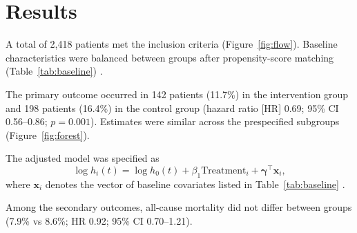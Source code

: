 \section{Results}
\label{sec:results}

A total of 2,418 patients met the inclusion criteria (Figure~\ref{fig:flow}). Baseline characteristics were balanced between groups after propensity-score matching (Table~\ref{tab:baseline}) \cite{austin2011introduction}.

The primary outcome occurred in 142 patients (11.7\%) in the intervention group and 198 patients (16.4\%) in the control group (hazard ratio [HR] 0.69; 95\% CI 0.56--0.86; $p = 0.001$). Estimates were similar across the prespecified subgroups (Figure~\ref{fig:forest}).

The adjusted model was specified as
\begin{equation}
  \log h_i(t) = \log h_0(t) + \beta_1 \text{Treatment}_i + \boldsymbol{\gamma}^\top \mathbf{x}_i ,
  \label{eq:cox}
\end{equation}
where $\mathbf{x}_i$ denotes the vector of baseline covariates listed in Table~\ref{tab:baseline} \cite{cox1972regression, therneau2000modeling}.

Among the secondary outcomes, all-cause mortality did not differ between groups (7.9\% vs 8.6\%; HR 0.92; 95\% CI 0.70--1.21).
